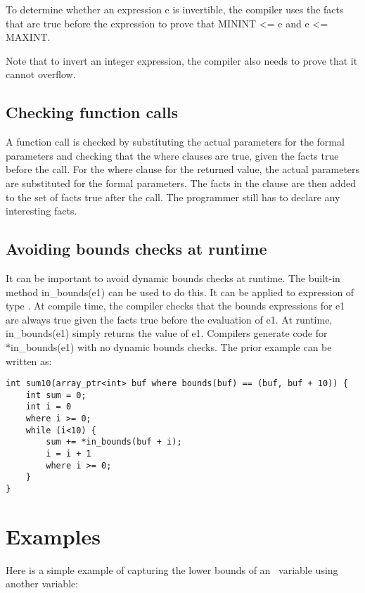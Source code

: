 To determine whether an expression e is invertible, the compiler uses
the facts that are true before the expression to prove that MININT
\textless{}= e and e \textless{}= MAXINT.

Note that to invert an integer expression, the compiler also needs to
prove that it cannot overflow.

\subsection{Checking function calls}

A function call is checked by substituting the actual parameters for the
formal parameters and checking that the where clauses are true, given
the facts true before the call. For the where clause for the returned
value, the actual parameters are substituted for the formal parameters.
The facts in the clause are then added to the set of facts true after
the call. The programmer still has to declare any interesting facts.

\subsection{Avoiding bounds checks at runtime}
\label{section:avoiding-bounds-checks}

It can be important to avoid dynamic bounds checks at runtime. The
built-in method in\_bounds(e1) can be used to do this. It can be applied
to expression of type \arrayptr. At compile time, the compiler
checks that the bounds expressions for e1 are always true given the
facts true before the evaluation of e1. At runtime, in\_bounds(e1)
simply returns the value of e1. Compilers generate code for
*in\_bounds(e1) with no dynamic bounds checks. The prior example can be
written as:

\begin{verbatim}
int sum10(array_ptr<int> buf where bounds(buf) == (buf, buf + 10)) {
    int sum = 0;
    int i = 0
    where i >= 0;
    while (i<10) {
        sum += *in_bounds(buf + i);
        i = i + 1
        where i >= 0;
    }
}
\end{verbatim}

\section{Examples}

Here is a simple example of capturing the lower bounds of an
\arrayptr\ variable using another variable:

